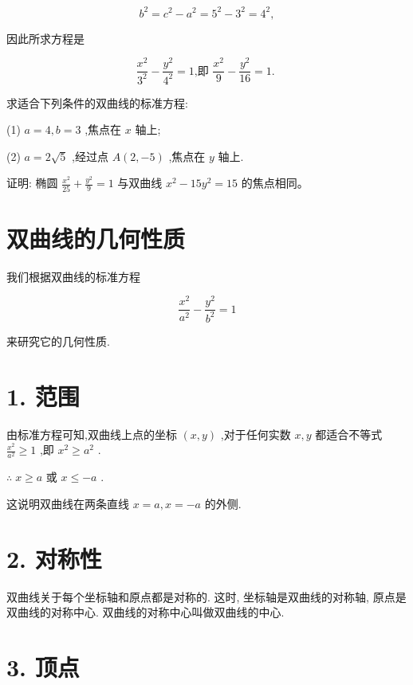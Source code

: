 \documentclass[lang=cn,newtx,12pt,scheme=chinese]{elegantbook}
\begin{document}
\[
    {b}^{2} = {c}^{2} - {a}^{2} = {5}^{2} - {3}^{2} = {4}^{2},
\]

因此所求方程是

\[
  \frac{{x}^{2}}{{3}^{2}} - \frac{{y}^{2}}{{4}^{2}} = 1\text{,即 }\frac{{x}^{2}}{9} - \frac{{y}^{2}}{16} = 1\text{. }
\]

\begin{problemset}[练习]

\item 求适合下列条件的双曲线的标准方程:

(1) \(a = 4,b = 3\) ,焦点在 \(x\) 轴上;

(2) \(a = 2\sqrt{5}\) ,经过点 \(A\left( {2, - 5}\right)\) ,焦点在 \(y\) 轴上.

\item 证明: 椭圆 \(\frac{{x}^{2}}{25} + \frac{{y}^{2}}{9} = 1\) 与双曲线 \({x}^{2} - {15}{y}^{2} = {15}\) 的焦点相同。

\end{problemset}

\section{双曲线的几何性质}

我们根据双曲线的标准方程

\[
  \frac{{x}^{2}}{{a}^{2}} - \frac{{y}^{2}}{{b}^{2}} = 1
\]

来研究它的几何性质.

\section*{1. 范围}

由标准方程可知,双曲线上点的坐标 \(\left( {x,y}\right)\) ,对于任何实数 \(x,y\) 都适合不等式 \(\frac{{x}^{2}}{{a}^{2}} \geq 1\) ,即 \({x}^{2} \geq {a}^{2}\) .

\(\therefore \;x \geq a\) 或 \(x \leq - a\) .

这说明双曲线在两条直线 \(x = a,x = - a\) 的外侧.

\section*{2. 对称性}

双曲线关于每个坐标轴和原点都是对称的. 这时, 坐标轴是双曲线的对称轴, 原点是双曲线的对称中心. 双曲线的对称中心叫做双曲线的中心.

\section*{3. 顶点}
\end{document}
